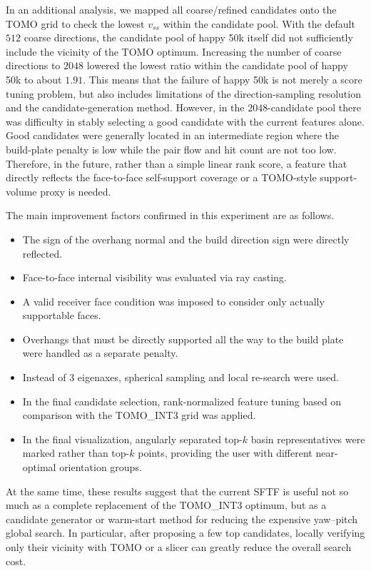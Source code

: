 \documentclass[11pt,a4paper]{article}
\begin{document}
In an additional analysis, we mapped all coarse/refined candidates onto the TOMO grid to check the lowest $v_{ss}$ within the candidate pool.
With the default $512$ coarse directions, the candidate pool of happy 50k itself did not sufficiently include the vicinity of the TOMO optimum.
Increasing the number of coarse directions to $2048$ lowered the lowest ratio within the candidate pool of happy 50k to about $1.91$.
This means that the failure of happy 50k is not merely a score tuning problem, but
also includes limitations of the direction-sampling resolution and the candidate-generation method.
However, in the $2048$-candidate pool there was difficulty in stably selecting a good candidate with the current features alone.
Good candidates were generally located in an intermediate region where the build-plate penalty is low while
the pair flow and hit count are not too low.
Therefore, in the future, rather than a simple linear rank score,
a feature that directly reflects the face-to-face self-support coverage or a TOMO-style support-volume proxy is needed.

The main improvement factors confirmed in this experiment are as follows.

\begin{itemize}
\item The sign of the overhang normal and the build direction sign were directly reflected.
\item Face-to-face internal visibility was evaluated via ray casting.
\item A valid receiver face condition was imposed to consider only actually supportable faces.
\item Overhangs that must be directly supported all the way to the build plate were handled as a separate penalty.
\item Instead of 3 eigenaxes, spherical sampling and local re-search were used.
\item In the final candidate selection, rank-normalized feature tuning based on comparison with the TOMO\_INT3 grid was applied.
\item In the final visualization, angularly separated top-$k$ basin representatives were marked rather than top-$k$ points,
providing the user with different near-optimal orientation groups.
\end{itemize}

At the same time, these results suggest that the current SFTF is useful not so much as a complete replacement of the TOMO\_INT3 optimum,
but as a candidate generator or warm-start method for reducing the expensive yaw--pitch global search.
In particular, after proposing a few top candidates,
locally verifying only their vicinity with TOMO or a slicer can greatly reduce the overall search cost.
\end{document}
